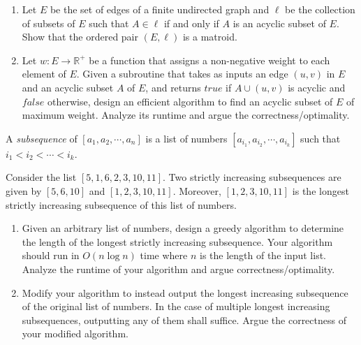 \documentclass{common/cs157}
\begin{document}
\homeworkhandin 

\begin{problem}{1}
\begin{enumerate}
    \item Let $E$ be the set of edges of a finite undirected graph and $\ell$ be the collection of subsets of $E$ such that $A \in \ell$ if and only if $A$ is an acyclic subset of $E$. Show that the ordered pair $(E, \ell)$ is a matroid. 
    
    \item Let $w:E \rightarrow \mathbb{R}^+$ be a function that assigns a non-negative weight to each element of $E$. Given a subroutine that takes as inputs an edge $(u,v)$ in $E$ and an acyclic subset $A$ of $E$, and returns $true$ if $A \cup {(u,v)}$ is acyclic and $false$ otherwise, design an efficient algorithm to find an acyclic subset of $E$ of maximum weight. Analyze its runtime and argue the correctness/optimality.
\end{enumerate}
\end{problem}

\newpage

\begin{problem}{2}
A \emph{subsequence} of $[a_1, a_2, \cdots, a_n]$ is a list of numbers $[a_{i_1}, a_{i_2}, \cdots, a_{i_k}]$ such that $i_1 < i_2 < \cdots < i_k$.

Consider the list $[5, 1, 6, 2, 3, 10, 11]$. Two strictly increasing subsequences are given by $[5, 6, 10]$ and $[1, 2, 3, 10, 11]$. Moreover, $[1, 2, 3, 10, 11]$ is the longest strictly increasing subsequence of this list of numbers.

\begin{enumerate}
    \item Given an arbitrary list of numbers, design a greedy algorithm to determine the length of the longest strictly increasing subsequence. Your algorithm should run in $O(n\log{n})$ time where $n$ is the length of the input list. Analyze the runtime of your algorithm and argue correctness/optimality.
    
    \item Modify your algorithm to instead output the longest increasing subsequence of the original list of numbers. In the case of multiple longest increasing subsequences, outputting any of them shall suffice. Argue the correctness of your modified algorithm.
\end{enumerate}
\end{problem}
\end{document}
